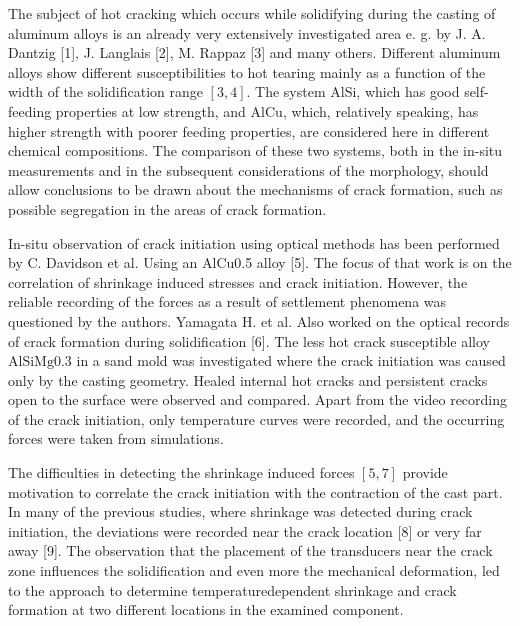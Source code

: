 \documentclass[10pt]{article}
\begin{document}
The subject of hot cracking which occurs while solidifying during the casting of aluminum alloys is an already very extensively investigated area e. g. by J. A. Dantzig [1], J. Langlais [2], M. Rappaz [3] and many others. Different aluminum alloys show different susceptibilities to hot tearing mainly as a function of the width of the solidification range $[3,4]$. The system AlSi, which has good self-feeding properties at low strength, and $\mathrm{AlCu}$, which, relatively speaking, has higher strength with poorer feeding properties, are considered here in different chemical compositions. The comparison of these two systems, both in the in-situ measurements and in the subsequent considerations of the morphology, should allow conclusions to be drawn about the mechanisms of crack formation, such as possible segregation in the areas of crack formation.

In-situ observation of crack initiation using optical methods has been performed by C. Davidson et al. Using an AlCu0.5 alloy [5]. The focus of that work is on the correlation of shrinkage induced stresses and crack initiation. However, the reliable recording of the forces as a result of settlement phenomena was questioned by the authors. Yamagata H. et al. Also worked on the optical records of crack formation during solidification [6]. The less hot crack susceptible alloy $\mathrm{AlSi} \mathrm{Mg} 0.3$ in a sand mold was investigated where the crack initiation was caused only by the casting geometry. Healed internal hot cracks and persistent cracks open to the surface were observed and compared. Apart from the video recording of the crack initiation, only temperature curves were recorded, and the occurring forces were taken from simulations.

The difficulties in detecting the shrinkage induced forces $[5,7]$ provide motivation to correlate the crack initiation with the contraction of the cast part. In many of the previous studies, where shrinkage was detected during crack initiation, the deviations were recorded near the crack location [8] or very far away [9]. The observation that the placement of the transducers near the crack zone influences the solidification and even more the mechanical deformation, led to the approach to determine temperaturedependent shrinkage and crack formation at two different locations in the examined component.
\end{document}
